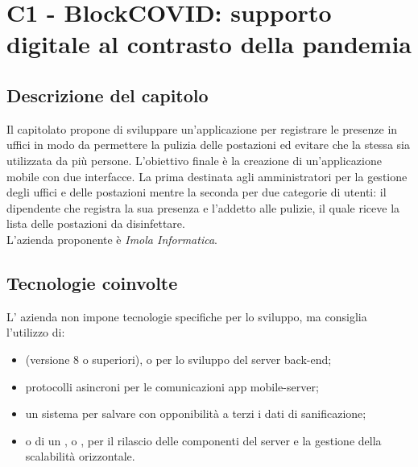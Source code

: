 \section{C1 - BlockCOVID: supporto digitale al contrasto della pandemia}
\subsection{Descrizione del capitolo}
Il capitolato propone di sviluppare un'applicazione per registrare le presenze in uffici in modo da permettere la pulizia delle postazioni ed evitare che la stessa sia utilizzata da più persone.
L'obiettivo finale è la creazione di un'applicazione mobile con due interfacce. La prima destinata agli amministratori per la gestione degli uffici e delle postazioni mentre la seconda per due categorie di utenti: il dipendente che registra la sua presenza e l'addetto alle pulizie, il quale riceve la lista delle postazioni da disinfettare.\\
L'azienda proponente è \textit{Imola Informatica}.

\subsection{Tecnologie coinvolte}
L' azienda non impone tecnologie specifiche per lo sviluppo, ma consiglia l'utilizzo di:
\begin{itemize}
\item {} (versione 8 o superiori),  o  per lo sviluppo del server back-end;
\item	protocolli asincroni per le comunicazioni app mobile-server;
\item	un sistema  per salvare con opponibilità a terzi i dati di sanificazione;
\item	{} o di un ,  o , per il rilascio delle componenti del server e la gestione della scalabilità orizzontale.
\end{itemize}

